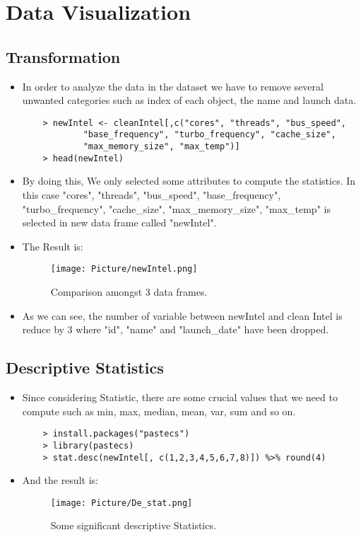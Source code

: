 \documentclass[a4paper]{article}
\begin{document}
\section{Data Visualization}
\subsection{Transformation}
\begin{itemize}
    \item[] In order to analyze the data in the dataset we have to remove several unwanted categories such as index of each object, the name and launch data.
    \begin{lstlisting}
    > newIntel <- cleanIntel[,c("cores", "threads", "bus_speed",
            "base_frequency", "turbo_frequency", "cache_size",
            "max_memory_size", "max_temp")]
    > head(newIntel)
    \end{lstlisting}
    
    \item[] By doing this, We only selected some attributes to compute the statistics. In this case "cores", "threads", "bus\_speed", "base\_frequency", "turbo\_frequency", "cache\_size", "max\_memory\_size", "max\_temp" is selected in new data frame called "newIntel".
    \item[] The Result is:
    
    \begin{figure}[H]
        \centering
        \texttt{[image: Picture/newIntel.png]}
        \caption{Comparison amongst 3 data frames.}
    \end{figure}
    
    \item[] As we can see, the number of variable between newIntel and clean Intel is reduce by 3 where "id", "name" and "launch\_date" have been dropped.
    
\end{itemize}

\subsection{Descriptive Statistics}
\begin{itemize}
    \item [] Since considering Statistic, there are some crucial values that we need to compute such as min, max, median, mean, var, sum and so on.
        
    \begin{lstlisting}
    > install.packages("pastecs")
    > library(pastecs)
    > stat.desc(newIntel[, c(1,2,3,4,5,6,7,8)]) %>% round(4)
    \end{lstlisting}
        
    \item[] And the result is:
    
    \begin{figure}[H]
        \centering
        \texttt{[image: Picture/De\_stat.png]}
        \caption{Some significant descriptive Statistics.}
    \end{figure}
\end{itemize}
\end{document}
